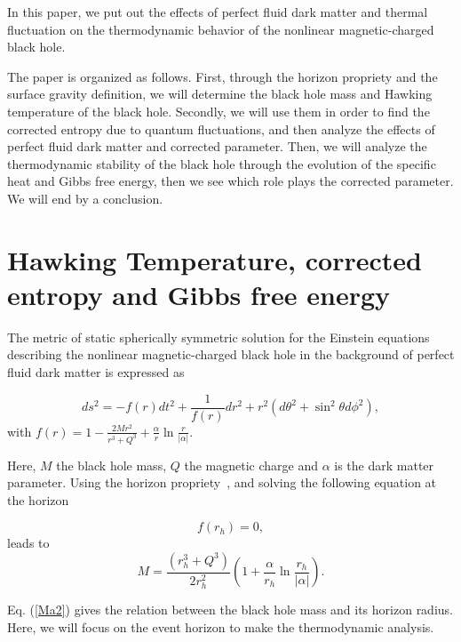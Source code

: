 \documentclass[10pt,letterpaper]{article}
\begin{document}
In this paper, we put out the effects of perfect fluid dark matter and thermal fluctuation on the thermodynamic behavior of the nonlinear magnetic-charged black hole. 

The paper is organized as follows. First, through the horizon propriety and the surface gravity definition, we will determine the black hole mass and  Hawking temperature of the black hole. Secondly, we will use them in order to find the corrected entropy due to quantum fluctuations, and then analyze the effects of perfect fluid dark matter and corrected parameter. Then, we will analyze the thermodynamic stability of the black hole through the evolution of the specific heat and Gibbs free energy, then we see which role plays the corrected parameter. We will end by a conclusion.



\section{Hawking Temperature, corrected entropy and Gibbs free energy}


The metric of static spherically symmetric solution for the Einstein equations describing the nonlinear magnetic-charged black hole in the background of perfect fluid dark matter is expressed as \cite{ma2021shadow,ndongmo2023thermodynamics}

\begin{equation}\label{}
ds^2=-f(r)dt^2+\frac{1}{f(r)}dr^2+r^2(d\theta^2+\sin^2\theta d\phi^2),
\end{equation}
with  $f(r)=1-\frac{2Mr^2}{r^3+Q^3}+\frac{\alpha}{r}\ln\frac{r}{|\alpha|}$.


Here, $M$ the black hole mass, $Q$ the magnetic charge and $\alpha$ is the dark matter parameter. Using the horizon propriety~\cite{nam2018on,tharanath2014phase}, and solving the following equation at the horizon

\begin{equation}
f(r_h)=0,												
\end{equation}
leads to
\begin{equation}\label{Ma2}
M=\frac{(r_h^3+Q^3)}{2r_h^2}\left(1+\frac{\alpha}{r_h}\ln\frac{r_h}{|\alpha|}\right).
\end{equation}

Eq. (\ref{Ma2}) gives the relation between the black hole mass and its horizon radius. Here, we will focus on the event horizon to make the thermodynamic analysis. 

%
\end{document}
